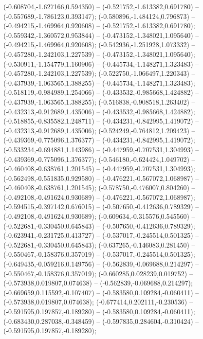  (-0.608704,-1.627166,0.594350) -- (-0.521752,-1.613382,0.691780) -- (-0.557689,-1.786123,0.393147);
 (-0.580896,-1.484124,0.796873) -- (-0.494215,-1.469964,0.920608) -- (-0.521752,-1.613382,0.691780);
 (-0.559342,-1.360572,0.953844) -- (-0.473152,-1.348021,1.095640) -- (-0.494215,-1.469964,0.920608);
 (-0.542936,-1.251928,1.073332) -- (-0.457280,-1.242103,1.227539) -- (-0.473152,-1.348021,1.095640);
 (-0.530911,-1.154779,1.160906) -- (-0.445734,-1.148271,1.323483) -- (-0.457280,-1.242103,1.227539);
 (-0.522750,-1.066497,1.220343) -- (-0.437939,-1.063565,1.388255) -- (-0.445734,-1.148271,1.323483);
 (-0.518119,-0.984989,1.254066) -- (-0.433532,-0.985668,1.424882) -- (-0.437939,-1.063565,1.388255);
 (-0.516838,-0.908518,1.263402) -- (-0.432313,-0.912689,1.435006) -- (-0.433532,-0.985668,1.424882);
 (-0.518855,-0.835582,1.248711) -- (-0.434231,-0.842995,1.419072) -- (-0.432313,-0.912689,1.435006);
 (-0.524249,-0.764812,1.209423) -- (-0.439369,-0.775096,1.376377) -- (-0.434231,-0.842995,1.419072);
 (-0.533234,-0.694881,1.143986) -- (-0.447959,-0.707531,1.304993) -- (-0.439369,-0.775096,1.376377);
 (-0.546180,-0.624424,1.049702) -- (-0.460408,-0.638761,1.201545) -- (-0.447959,-0.707531,1.304993);
 (-0.562498,-0.551835,0.929580) -- (-0.476221,-0.567072,1.068987) -- (-0.460408,-0.638761,1.201545);
 (-0.578750,-0.476007,0.804260) -- (-0.492108,-0.491624,0.930689) -- (-0.476221,-0.567072,1.068987);
 (-0.594515,-0.397142,0.676015) -- (-0.507650,-0.412636,0.789329) -- (-0.492108,-0.491624,0.930689);
 (-0.609634,-0.315576,0.545560) -- (-0.522681,-0.330450,0.645843) -- (-0.507650,-0.412636,0.789329);
 (-0.623941,-0.231725,0.413727) -- (-0.537017,-0.245514,0.501325) -- (-0.522681,-0.330450,0.645843);
 (-0.637265,-0.146083,0.281450) -- (-0.550467,-0.158376,0.357019) -- (-0.537017,-0.245514,0.501325);
 (-0.649435,-0.059216,0.149756) -- (-0.562839,-0.069688,0.214297) -- (-0.550467,-0.158376,0.357019);
 (-0.660285,0.028239,0.019752) -- (-0.573938,0.019807,0.074638) -- (-0.562839,-0.069688,0.214297);
 (-0.669659,0.115592,-0.107407) -- (-0.583580,0.109284,-0.060411) -- (-0.573938,0.019807,0.074638);
 (-0.677414,0.202111,-0.230536) -- (-0.591595,0.197857,-0.189280) -- (-0.583580,0.109284,-0.060411);
 (-0.683430,0.287038,-0.348459) -- (-0.597835,0.284604,-0.310424) -- (-0.591595,0.197857,-0.189280);
